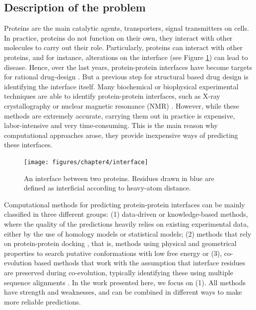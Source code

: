 \documentclass[10pt,a4paper,twoside]{book}
\begin{document}
\subsection{Description of the problem}

Proteins are the main catalytic agents, transporters, signal transmitters on cells. In practice, proteins do not function on their own, they interact with other molecules to carry out their role. Particularly, proteins can interact with other proteins, and for instance, alterations on the interface (see Figure \ref{fig:interface}) can lead to disease. Hence, over the last years, protein-protein interfaces have become targets for rational drug-design \cite{Jubb2015}. But a previous step for structural based drug design is identifying the interface itself. Many biochemical or biophysical experimental techniques are able to identify protein-protein interfaces, such as X-ray crystallography \cite{Shi2014} or nuclear magnetic resonance (NMR) \cite{Gobl2014}. However, while these methods are extremely accurate, carrying them out in practice is expensive, labor-intensive and very time-consuming. This is the main reason why computational approaches arose, they provide inexpensive ways of predicting these interfaces.\\

\begin{figure}
\centering
\caption{An interface between two proteins. Residues drawn in blue are defined as interficial according to heavy-atom distance.}
\texttt{[image: figures/chapter4/interface]}
\label{fig:interface}
\end{figure}

Computational methods for predicting protein-protein interfaces can be mainly classified in three different groups: (1) data-driven or knowledge-based methods, where the quality of the predictions heavily relies on existing experimental data, either by the use of homology models \cite{Jordan2012, Xue2011} or statistical models; (2) methods that rely on protein-protein docking \cite{Vakser2014}, that is, methods using physical and geometrical properties to search putative conformations with low free energy or (3), co-evolution based methods that work with the assumption that interface residues are preserved during co-evolution, typically identifying these using multiple sequence alignments \cite{Hopf2014}. In the work presented here, we focus on (1). All methods have strength and weaknesses, and can be combined in different ways to make more reliable predictions.\\
\end{document}
